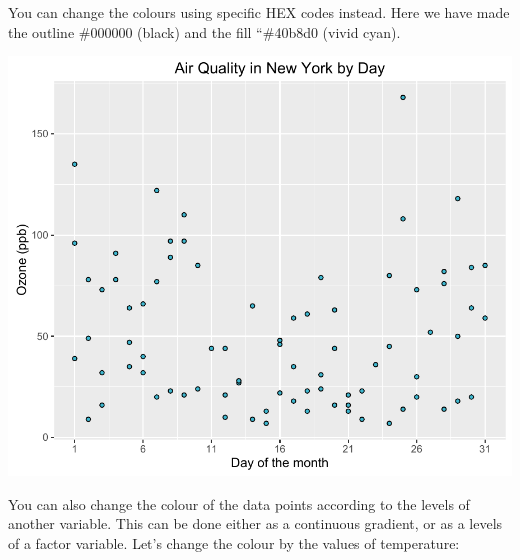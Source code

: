 You can change the colours using specific HEX codes instead. Here we
have made the outline \#000000 (black) and the fill ``\#40b8d0 (vivid
cyan).

\begin{Shaded}
\begin{Highlighting}[]
\StringTok{ }\NormalTok{(}  \StringTok{ }
\StringTok{  }\NormalTok{(} \NormalTok{, } \NormalTok{, } \NormalTok{) +}
\StringTok{  }\NormalTok{(}\NormalTok{) +}\StringTok{ }
\StringTok{  }\NormalTok{(} \NormalTok{, } \NormalTok{) +}
\StringTok{  }\NormalTok{(} \NormalTok{(}\NormalTok{, }\NormalTok{, }\NormalTok{))}
\end{Highlighting}
\end{Shaded}

\begin{center}\includegraphics[width=0.6\linewidth]{5_Scatter_Plots_pdf/scatter_6-1} \end{center}

You can also change the colour of the data points according to the
levels of another variable. This can be done either as a continuous
gradient, or as a levels of a factor variable. Let's change the colour
by the values of temperature:

